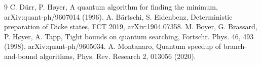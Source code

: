 \documentclass[10pt,twocolumn]{article}
\begin{document}
\begin{thebibliography}{9}\footnotesize\setlength{\itemsep}{0pt}
 C. D\"urr, P. H{\o}yer, A quantum algorithm for finding the minimum, arXiv:quant-ph/9607014 (1996).
 A. B\"artschi, S. Eidenbenz, Deterministic preparation of Dicke states, FCT 2019, arXiv:1904.07358.
 M. Boyer, G. Brassard, P. H{\o}yer, A. Tapp, Tight bounds on quantum searching, Fortschr. Phys. 46, 493 (1998), arXiv:quant-ph/9605034.
 A. Montanaro, Quantum speedup of branch-and-bound algorithms, Phys. Rev. Research 2, 013056 (2020).
\end{thebibliography}
\end{document}
